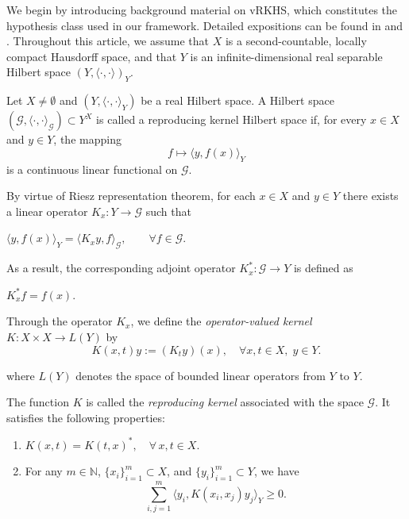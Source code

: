 \documentclass[twoside,11pt]{article}
\begin{document}
 We begin by introducing background material on vRKHS, which constitutes the hypothesis class used in our framework. Detailed expositions can be found in \cite{VRKHS(BASIC)} and \cite{carmeli2008vectorvaluedreproducingkernel}. Throughout this article, we assume that $X$ is a second-countable, locally compact Hausdorff space, and that $Y$ is an infinite-dimensional real separable Hilbert space $(Y,\langle \cdot,\cdot \rangle)_Y$.



\begin{definition}
Let $X \neq \emptyset $ and $(Y, \langle \cdot, \cdot \rangle_Y)$ be a real Hilbert space. 
A Hilbert space $(\mathcal{G}, \langle \cdot, \cdot \rangle_{\mathcal{G}}) \subset Y^X$ 
is called a {reproducing kernel Hilbert space} if, for every $x \in X$ and $y \in Y$, 
the mapping 
\[
f \mapsto \langle y, f(x) \rangle_Y
\]
is a continuous linear functional on $\mathcal{G}$.

\end{definition}

\noindent
By virtue of Riesz representation theorem, for each $x \in X$ and $y \in Y$ there 
exists a linear operator $K_x : Y \to \mathcal{G}$ such that
\begin{center}
  $\langle y, f(x) \rangle_Y = \langle K_x y, f \rangle_{\mathcal{G}}, 
\qquad \forall f \in \mathcal{G}.
$    
\end{center}

\vspace{0.4em}

\noindent
As a result, the corresponding adjoint operator $K_x^* : \mathcal{G} \to Y$ 
is defined as
\begin{center}
$K_x^* f = f(x).$



\end{center}
\vspace{0.5em}
\noindent
Through the operator $K_x$, we define the \emph{operator-valued kernel}
$
K : X \times X \to {L}(Y)$
by
\[
  K(x,t)y := (K_t y)(x), \quad \forall x,t \in X,\; y \in Y.
\]


\noindent
where $L(Y)$ denotes the space of bounded linear operators from $Y$ to $Y$.

\vspace{0.2em}

\noindent
The function $K$ is called the \emph{reproducing kernel} associated with the space 
$\mathcal{G}$. It satisfies the following properties:
\begin{enumerate}
    \item $K(x, t) = K(t, x)^*, \quad \forall \, x, t \in X.$
    \item For any $m \in \mathbb{N}$, $\{x_i\}_{i=1}^m \subset X$, and $\{y_i\}_{i=1}^m \subset Y$, we have
    \[
        \sum_{i,j=1}^{m} \langle y_i, K(x_i, x_j) y_j \rangle_Y \ge 0.
    \]
\end{enumerate}
\end{document}
